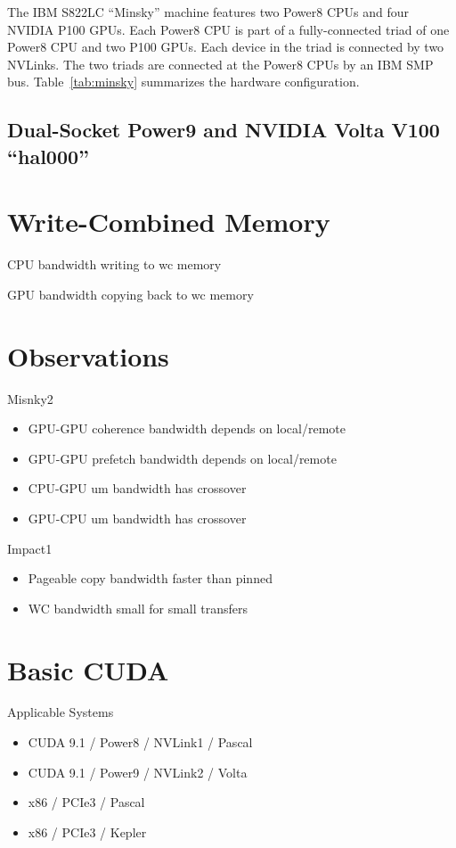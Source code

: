 The IBM S822LC ``Minsky'' machine features two Power8 CPUs and four NVIDIA P100 GPUs.
Each Power8 CPU is part of a fully-connected triad of one Power8 CPU and two P100 GPUs.
Each device in the triad is connected by two NVLinks.
The two triads are connected at the Power8 CPUs by an IBM SMP bus.
Table~\ref{tab:minsky} summarizes the hardware configuration.

\subsection{Dual-Socket Power9 and NVIDIA Volta V100 ``hal000''}

\section{Write-Combined Memory}

CPU bandwidth writing to wc memory

GPU bandwidth copying back to wc memory


\section{Observations}

Misnky2
\begin{itemize}
\item GPU-GPU coherence bandwidth depends on local/remote
\item GPU-GPU prefetch bandwidth depends on local/remote
\item CPU-GPU um bandwidth has crossover
\item GPU-CPU um bandwidth has crossover
\end{itemize}

Impact1
\begin{itemize}
    \item Pageable copy bandwidth faster than pinned
    \item WC bandwidth small for small transfers
\end{itemize}


\section{Basic CUDA}

Applicable Systems
\begin{itemize}
    \item CUDA 9.1 / Power8 / NVLink1 / Pascal
    \item CUDA 9.1 / Power9 / NVLink2 / Volta
    \item x86 / PCIe3 / Pascal
    \item x86 / PCIe3 / Kepler
\end{itemize}

